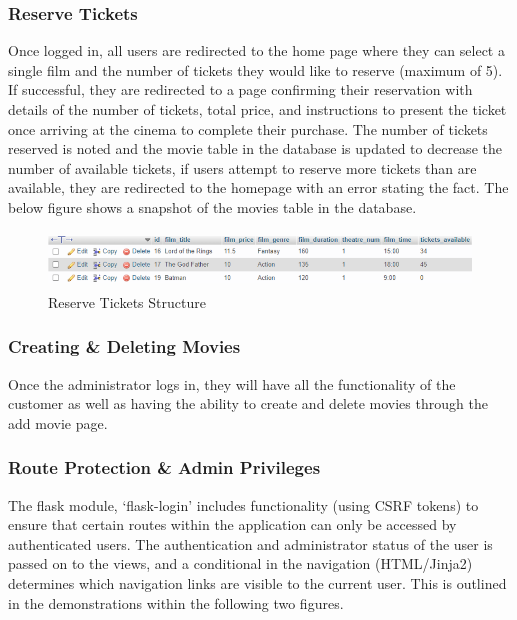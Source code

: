 \documentclass[11pt, english]{article}
\begin{document}
		\subsubsection{Reserve Tickets}

	Once logged in, all users are redirected to the home page where they can select a single film and the number of tickets they would like to reserve (maximum of 5). If successful, they are redirected to a page confirming their reservation with details of the number of tickets, total price, and instructions to present the ticket once arriving at the cinema to complete their purchase. The number of tickets reserved is noted and the movie table in the database is updated to decrease the number of available tickets, if users attempt to reserve more tickets than are available, they are redirected to the homepage with an error stating the fact. The below figure shows a snapshot of the movies table in the database.

	\begin{figure}[H]
	\begin{center}
		\includegraphics[width=14cm,height=1.5cm]{CS993_IMG/Reserve.png}
		\caption{Reserve Tickets Structure}
	\end{center}
	\end{figure}

		\subsubsection{Creating \& Deleting Movies}

	Once the administrator logs in, they will have all the functionality of the customer as well as having the ability to create and delete movies through the add movie page.

		\subsubsection{Route Protection \& Admin Privileges}

	The flask module, `flask-login' includes functionality (using CSRF tokens) to ensure that certain routes within the application can only be accessed by authenticated users. The authentication and administrator status of the user is passed on to the views, and a conditional in the navigation (HTML/Jinja2) determines which navigation links are visible to the current user. This is outlined in the demonstrations within the following two figures.
\end{document}
